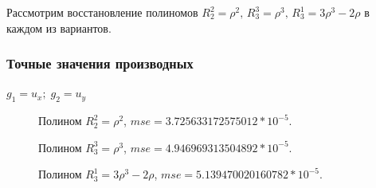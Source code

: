 \documentclass{article}
\begin{document}
Рассмотрим восстановление полиномов $R_2^2 = \rho^2,\,R_3^3 = \rho^3,\,R_3^1 = 3\rho^3 - 2\rho$ в каждом из вариантов.
\subsubsection{Точные значения производных}
$g_1 = u_x;\; g_2 = u_y$
\begin{figure}[H]
\caption{Полином $R_2^2 = \rho^2$, $mse = 3.725633172575012*10^{-5}$.}
\end{figure}

\begin{figure}[H]
\caption{Полином $R_3^3 = \rho^3$, $mse = 4.946969313504892*10^{-5}$.}
\end{figure}

\begin{figure}[H]
\caption{Полином $R_3^1 = 3\rho^3 - 2\rho$, $mse = 5.139470020160782*10^{-5}$.}
\end{figure}
\end{document}

